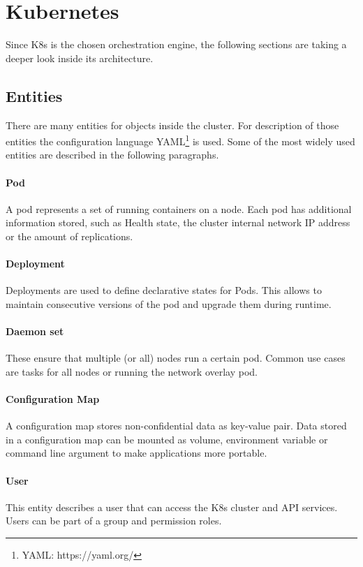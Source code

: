 \section{Kubernetes}
Since \ac{K8s} is the chosen orchestration engine, the following sections are taking a deeper look inside its architecture.

\subsection{Entities}
There are many entities for objects inside the cluster. For description of those entities the configuration language YAML\footnote{YAML: https://yaml.org/} is used. Some of the most widely used entities are described in the following paragraphs.

\paragraph*{Pod} A pod represents a set of running containers on a node. Each pod has additional information stored, such as Health state, the cluster internal network \ac{IP} address or the amount of replications.
\paragraph*{Deployment}
Deployments are used to define declarative states for Pods. This allows to maintain consecutive versions of the pod and upgrade them during runtime.
\paragraph*{Daemon set} These ensure that multiple (or all) nodes run a certain pod\cite{Kubernetes.20220831}. Common use cases are tasks for all nodes or running the network overlay pod.
\paragraph*{Configuration Map} A configuration map stores non-confidential data as key-value pair\cite{Kubernetes.20221024b}. Data stored in a configuration map can be mounted as volume, environment variable or command line argument to make applications more portable\cite{Kubernetes.20221024b}.
\paragraph*{User} This entity describes a user that  can access the \ac{K8s} cluster and \ac{API} services. Users can be part of a group and permission roles.
